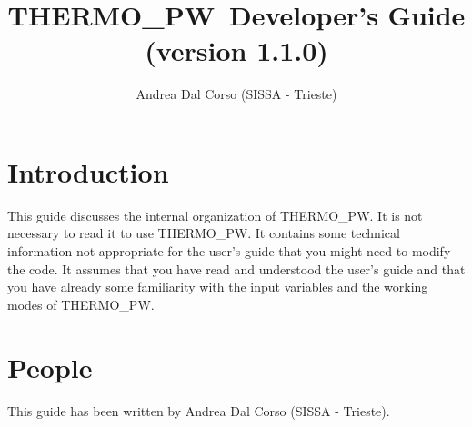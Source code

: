 \documentclass[12pt,a4paper]{article}
\def\version{1.1.0}
\def\tpw{{\sc THERMO\_PW}}
\begin{document}
\author{Andrea Dal Corso (SISSA - Trieste)}
\date{}


\title{
  \vskip 1cm
  {\color{red}\Huge \tpw\ Developer's Guide} \\
  \Large (version \version)
}
\maketitle

\tableofcontents

\newpage

\section{\color{coral}Introduction}
This guide discusses the internal organization of \tpw. It is not necessary
to read it to use \tpw. It contains some technical information not 
appropriate for the user's guide that you might need to modify the code.
It assumes that you have read and understood the user's guide and that
you have already some familiarity with the input variables and 
the working modes of \tpw.

\section{\color{coral}People}
This guide has been written by Andrea Dal Corso (SISSA - Trieste). 

\newpage
\end{document}
